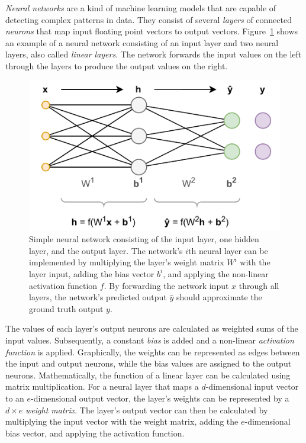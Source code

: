 \emph{Neural networks} are a kind of machine learning models that are capable of detecting complex patterns in data. They consist of several \emph{layers} of connected \emph{neurons} that map input floating point vectors to output vectors. Figure~\ref{fig:2_basics/1_neural_networks/nn} shows an example of a neural network consisting of an input layer and two neural layers, also called \emph{linear layers}. The network forwards the input values on the left through the layers to produce the output values on the right.

\begin{figure}[t]
    \centering
    \includegraphics{2_basics/1_neural_networks/nn}
    \caption{Simple neural network consisting of the input layer, one hidden layer, and the output layer. The network's $i$th neural layer can be implemented by multiplying the layer's weight matrix $W^i$ with the layer input, adding the bias vector $b^i$, and applying the non-linear activation function $f$. By forwarding the network input $x$ through all layers, the network's predicted output $\hat{y}$ should approximate the ground truth output $y$.}
    \label{fig:2_basics/1_neural_networks/nn}
\end{figure}

The values of each layer's output neurons are calculated as weighted sums of the input values. Subsequently, a constant \emph{bias} is added and a non-linear \emph{activation function} is applied. Graphically, the weights can be represented as edges between the input and output neurons, while the bias values are assigned to the output neurons. Mathematically, the function of a linear layer can be calculated using matrix multiplication. For a neural layer that maps a $d$-dimensional input vector to an $e$-dimensional output vector, the layer's weights can be represented by a $d \times e$ \emph{weight matrix}. The layer's output vector can then be calculated by multiplying the input vector with the weight matrix, adding the $e$-dimensional bias vector, and applying the activation function.

